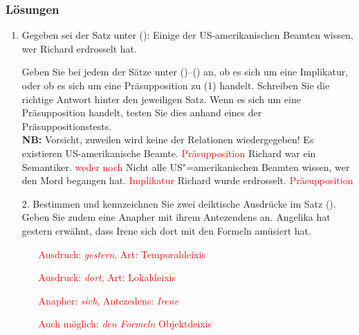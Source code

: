 {%
\begin{frame}[shrink=5]
\frametitle{Lösungen}

\begin{enumerate}
\item Gegeben sei der Satz unter ():
\ea
Einige der US-amerikanischen Beamten wissen, wer Richard erdrosselt hat.
\z
\item [] Geben Sie bei jedem der Sätze unter ()--() an, ob es sich um eine Implikatur, oder ob es sich um eine Präsupposition zu (1) handelt. Schreiben Sie die richtige Antwort hinter den jeweiligen Satz. Wenn es sich um eine Präsupposition handelt, testen Sie dies anhand eines der Präsuppositionstests. \\
\textbf{NB:} Vorsicht, zuweilen wird keine der Relationen wiedergegeben!
\ea\label{ex:Prag43} Es existieren US-amerikanische Beamte. \textcolor{red}{\ras Präsupposition}
\ex\label{ex:Prag44} Richard war ein Semantiker. \textcolor{red}{\ras weder noch}
\ex\label{ex:Prag45} Nicht alle US"=amerikanischen Beamten wissen, wer den Mord begangen hat. \textcolor{red}{\ras Implikatur}
\ex\label{ex:Prag46} Richard wurde erdrosselt. \textcolor{red}{\ras Präsupposition}
\z	
\end{enumerate}

\end{frame}


\begin{frame}
\begin{enumerate}
\item[2.] Bestimmen und kennzeichnen Sie zwei deiktische Ausdrücke im Satz (). Geben Sie zudem eine Anapher mit ihrem Antezendens an.
\ea
Angelika hat gestern erwähnt, dass Irene sich dort mit den Formeln amüsiert hat.
\z 


\begin{itemize}
\item[] \textcolor{red}{Ausdruck: \emph{gestern}, Art: Temporaldeixis}
\item[] \textcolor{red}{Ausdruck: \emph{dort}, Art: Lokaldeixis}
\item[] \textcolor{red}{Anapher: \emph{sich}, Antezedens: \emph{Irene}}
\item[] \textcolor{red}{Auch möglich: \emph{den Formeln} \ras Objektdeixis}
\end{itemize}


\end{enumerate}
\end{frame}}
